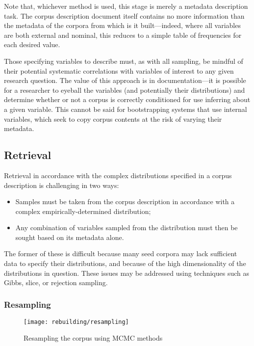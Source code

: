 Note that, whichever method is used, this stage is merely a metadata description task.  The corpus description document itself contains no more information than the metadata of the corpora from which is it built---indeed, where all variables are both external and nominal, this reduces to a simple table of frequencies for each desired value.  

Those specifying variables to describe must, as with all sampling, be mindful of their potential systematic correlations with variables of interest to any given research question.  The value of this approach is in documentation---it is possible for a researcher to eyeball the variables (and potentially their distributions) and determine whether or not a corpus is correctly conditioned for use inferring about a given variable.  This cannot be said for bootstrapping systems that use internal variables, which seek to copy corpus contents at the risk of varying their metadata.



\subsection{Retrieval}
Retrieval in accordance with the complex distributions specified in a corpus description is challenging in two ways:

\begin{itemize}
    \item Samples must be taken from the corpus description in accordance with a complex empirically-determined distribution;
    \item Any combination of variables sampled from the distribution must then be sought based on its metadata alone.
\end{itemize}

The former of these is difficult because many seed corpora may lack sufficient data to specify their distributions, and because of the high dimensionality of the distributions in question.  These issues may be addressed using techniques such as Gibbs, slice, or rejection sampling.  



\subsubsection{Resampling}

\begin{figure}[h]
    \centering
    \texttt{[image: rebuilding/resampling]}
    \caption{Resampling the corpus using MCMC methods}
    \label{fig:rebuilding:resampling}
\end{figure}



